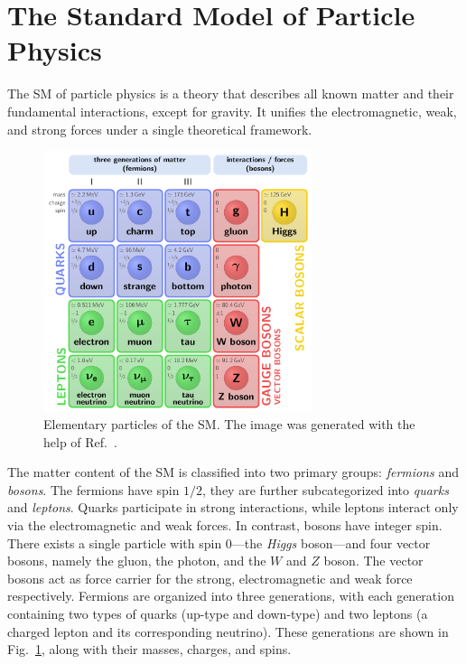 \section{The Standard Model of Particle Physics} \label{sec:2:EW_symmetry_breaking}
The \acs{SM} of particle physics is a theory that describes all known matter and their fundamental interactions, except for gravity. It unifies the electromagnetic, weak, and strong forces under a single theoretical framework.
\begin{figure}
\centering
\includegraphics[width=0.7\textwidth]{Images/SM.pdf}
\caption{Elementary particles of the \acs{SM}. The image was generated with the help of Ref.~\cite{Neutelings_2024}.}
\label{fig:2:SM}
\end{figure}
The matter content of the \acs{SM} is classified into two primary groups: \textit{fermions} and \textit{bosons}. The fermions have spin $1/2$, they are further subcategorized into \textit{quarks} and \textit{leptons}. Quarks participate in strong interactions, while leptons interact only via the electromagnetic and weak forces. In contrast, bosons have integer spin. There exists a single particle with spin 0---the \textit{Higgs} boson---and four vector bosons, namely the gluon, the photon, and the $W$ and $Z$ boson. The vector bosons act as force carrier for the strong, electromagnetic and weak force respectively. Fermions are organized into three generations, with each generation containing two types of quarks (up-type and down-type) and two leptons (a charged lepton and its corresponding neutrino). These generations are shown in Fig.~\ref{fig:2:SM}, along with their masses, charges, and spins.

